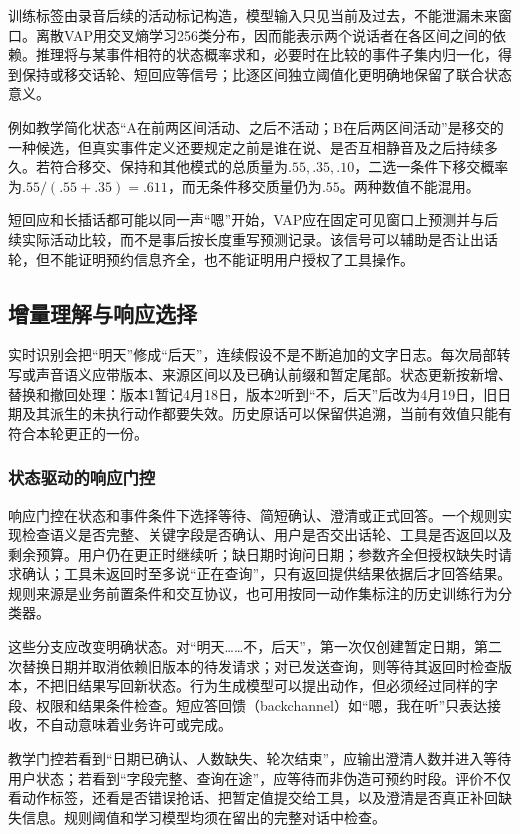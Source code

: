 训练标签由录音后续的活动标记构造，模型输入只见当前及过去，不能泄漏未来窗口。离散VAP用交叉熵学习256类分布，因而能表示两个说话者在各区间之间的依赖。推理将与某事件相符的状态概率求和，必要时在比较的事件子集内归一化，得到保持或移交话轮、短回应等信号；比逐区间独立阈值化更明确地保留了联合状态意义。

例如教学简化状态“A在前两区间活动、之后不活动；B在后两区间活动”是移交的一种候选，但真实事件定义还要规定之前是谁在说、是否互相静音及之后持续多久。若符合移交、保持和其他模式的总质量为$.55,.35,.10$，二选一条件下移交概率为$.55/(.55+.35)=.611$，而无条件移交质量仍为$.55$。两种数值不能混用。

短回应和长插话都可能以同一声“嗯”开始，VAP应在固定可见窗口上预测并与后续实际活动比较，而不是事后按长度重写预测记录。该信号可以辅助是否让出话轮，但不能证明预约信息齐全，也不能证明用户授权了工具操作。

\subsection{增量理解与响应选择}
\label{sec:nlp-speech-incremental-understanding}

实时识别会把“明天”修成“后天”，连续假设不是不断追加的文字日志。每次局部转写或声音语义应带版本、来源区间以及已确认前缀和暂定尾部。状态更新按新增、替换和撤回处理：版本1暂记4月18日，版本2听到“不，后天”后改为4月19日，旧日期及其派生的未执行动作都要失效。历史原话可以保留供追溯，当前有效值只能有符合本轮更正的一份。

\subsubsection{状态驱动的响应门控}
\label{sec:nlp-speech-response-gate}

响应门控在状态和事件条件下选择等待、简短确认、澄清或正式回答。一个规则实现检查语义是否完整、关键字段是否确认、用户是否交出话轮、工具是否返回以及剩余预算。用户仍在更正时继续听；缺日期时询问日期；参数齐全但授权缺失时请求确认；工具未返回时至多说“正在查询”，只有返回提供结果依据后才回答结果。规则来源是业务前置条件和交互协议，也可用按同一动作集标注的历史训练行为分类器。

这些分支应改变明确状态。对“明天……不，后天”，第一次仅创建暂定日期，第二次替换日期并取消依赖旧版本的待发请求；对已发送查询，则等待其返回时检查版本，不把旧结果写回新状态。行为生成模型可以提出动作，但必须经过同样的字段、权限和结果条件检查。短应答回馈（backchannel）如“嗯，我在听”只表达接收，不自动意味着业务许可或完成。

教学门控若看到“日期已确认、人数缺失、轮次结束”，应输出澄清人数并进入等待用户状态；若看到“字段完整、查询在途”，应等待而非伪造可预约时段。评价不仅看动作标签，还看是否错误抢话、把暂定值提交给工具，以及澄清是否真正补回缺失信息。规则阈值和学习模型均须在留出的完整对话中检查。

